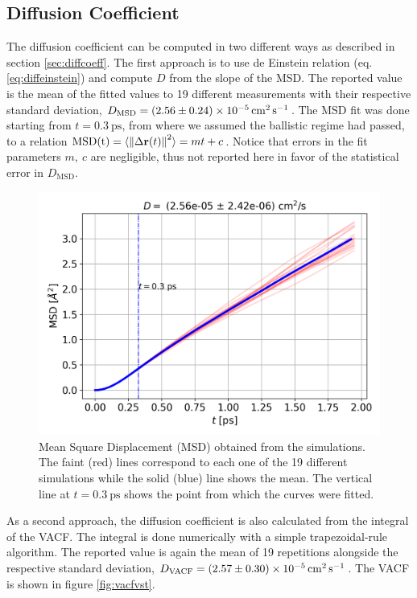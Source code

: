 \documentclass[%
aps,
pra,%
amsmath,amssymb,
preprint,%
reprint,%
notitlepage,
a4paper]{revtex4-1}
\newcommand{\average}[1]{\langle #1 \rangle}
\begin{document}
\subsection{Diffusion Coefficient}
The diffusion coefficient can be computed in two different ways as described in section \ref{sec:diffcoeff}. The first approach is to use de Einstein relation (eq. \ref{eq:diffeinstein}) and compute $D$ from the slope of the MSD. The reported value is the mean of the fitted values to 19 different measurements with their respective standard deviation, $D_{\mathrm{MSD}} = \SI{2.56 \pm 0.24 e-5}{\square\centi\meter\per\second}$. The MSD fit was done starting from $t = \SI{0.3}{\pico\second}$, from where we assumed the ballistic regime had passed, to a relation $\mathrm{MSD(t)}  = \average{\norm{\Delta\vb{r}(t)}^2}= mt + c$. Notice that errors in the fit parameters $m,\ c$ are negligible, thus not reported here in favor of the statistical error in $D_{\mathrm{MSD}}$.\\
\begin{figure}
	\centering
	\includegraphics[width=0.99\linewidth]{../task2/results/msdvst}
	\caption{Mean Square Displacement (MSD) obtained from the simulations. The faint (red) lines correspond to each one of the 19 different simulations while the solid (blue) line shows the mean. The vertical line at $t = \SI{0.3}{\pico\second}$ shows the point from which the curves were fitted.}
	\label{fig:msdvst}
\end{figure}
As a second approach, the diffusion coefficient is also calculated from the integral of the VACF. The integral is done numerically with a simple trapezoidal-rule algorithm. The reported value is again the mean of 19 repetitions alongside the respective standard deviation, $D_\mathrm{VACF} = \SI{2,57 \pm 0.3 e-5}{\square\centi\meter\per\second}$. The VACF is shown in figure \ref{fig:vacfvst}.\\
\end{document}
